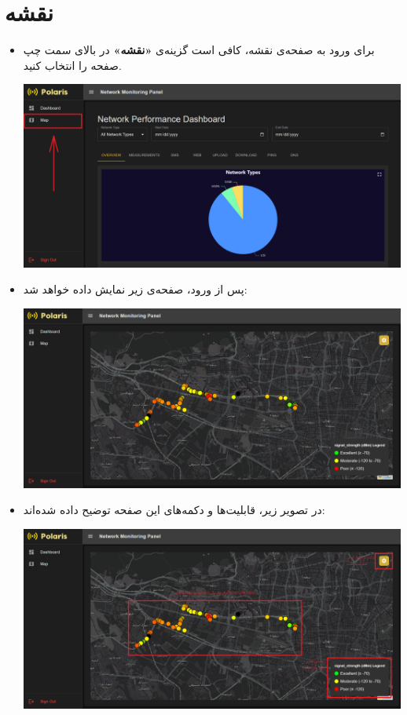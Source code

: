     \section{نقشه}
\begin{itemize}
    \item برای ورود به صفحه‌ی نقشه، کافی است گزینه‌ی \textbf{«نقشه»} در بالای سمت چپ صفحه را انتخاب کنید.
    \begin{center}
        \includegraphics[width=\textwidth]{images/go_to_map.png}
    \end{center}

    \item پس از ورود، صفحه‌ی زیر نمایش داده خواهد شد:
    \begin{center}
        \includegraphics[width=\textwidth]{images/map_overall.png}
    \end{center}

    \item در تصویر زیر، قابلیت‌ها و دکمه‌های این صفحه توضیح داده شده‌اند:
    \begin{center}
        \includegraphics[width=\textwidth]{images/map_overall_explained.png}
    \end{center}


\end{itemize}
